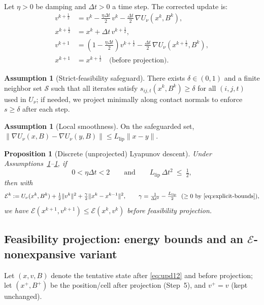 \documentclass[11pt]{article}
\newtheorem{proposition}[theorem]{Proposition}
\theoremstyle{remark}
\theoremstyle{definition}
\newtheorem{assumption}[theorem]{Assumption}
\newcommand{\Llip}{L_{\text{lip}}}
\newcommand{\ShiftSet}{\mathcal{S}}            %
\begin{document}
Let $\eta>0$ be damping and $\Delta t>0$ a time step.
The corrected update is:
\begin{equation}\label{eq:upd12}
\boxed{
\begin{aligned}
v^{k+\frac12} &= v^k - \frac{\eta\Delta t}{2}\, v^k - \frac{\Delta t}{2}\,\nabla U_\nu(x^k,B^k),\\
x^{k+\frac12} &= x^k + \Delta t\, v^{k+\frac12},\\
v^{k+1} &= \left(1 - \frac{\eta\Delta t}{2}\right) v^{k+\frac12} - \frac{\Delta t}{2}\,\nabla U_\nu(x^{k+\frac12},B^k),\\
x^{k+1} &= x^{k+\frac12} \quad\text{(before projection)}.
\end{aligned}
}
\tag{12}
\end{equation}

\begin{assumption}[Strict-feasibility safeguard]\label{ass:safeguard}
There exists $\delta\in(0,1)$ and a finite neighbor set $\ShiftSet$ such that all iterates satisfy $s_{ij,t}(x^k,B^k)\ge \delta$ for all $(i,j,t)$ used in $U_\nu$; if needed, we project minimally along contact normals to enforce $s\ge \delta$ after each step.
\end{assumption}

\begin{assumption}[Local smoothness]\label{ass:smooth}
On the safeguarded set, $\|\nabla U_\nu(x,B)-\nabla U_\nu(y,B)\|\le \Llip\|x-y\|$.
\end{assumption}

\begin{proposition}[Discrete (unprojected) Lyapunov descent]\label{prop:discrete-descent}
Under Assumptions~\ref{ass:safeguard}--\ref{ass:smooth}, if
\begin{equation}\label{eq:explicit-bounds}
0<\eta\Delta t<2
\qquad\text{and}\qquad
\Llip\,\Delta t^2\ \le\ \tfrac12,
\end{equation}
then with
\begin{equation}\label{eq:Ed}
\mathcal{E}^k := U_\nu(x^k,B^k) + \tfrac12 \|v^k\|^2 + \tfrac{\gamma}{2}\|x^k-x^{k-1}\|^2,\qquad 
\gamma=\tfrac{1}{\Delta t^2}-\tfrac{\Llip}{2}\ \ (\ge 0 \text{ by } \eqref{eq:explicit-bounds}),
\end{equation}
we have $\mathcal{E}(x^{k+1},v^{k+1})\le \mathcal{E}(x^k,v^k)$ \emph{before} feasibility projection.
\end{proposition}

\subsection{Feasibility projection: energy bounds and an \texorpdfstring{$\mathcal{E}$}{E}-nonexpansive variant}\label{sec:proj-energy}
Let $(x,v,B)$ denote the tentative state after \eqref{eq:upd12} and before projection; let $(x^+,B^+)$ be the position/cell after projection (Step~5), and $v^+=v$ (kept unchanged).
\end{document}
